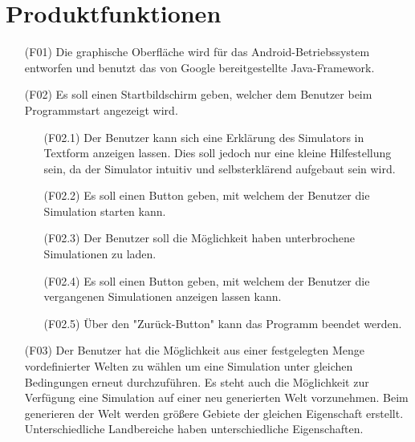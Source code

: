 \documentclass[a4paper, 10pt]{article}
\begin{document}
\section{Produktfunktionen}
\begin{enumerate}
\item[(F01)] Die graphische Oberfläche wird für das Android-Betriebssystem entworfen und benutzt das von Google bereitgestellte Java-Framework. 

\item[(F02)] Es soll einen Startbildschirm geben, welcher dem Benutzer beim Programmstart angezeigt wird.
\begin{enumerate}
\item[(F02.1)]
Der Benutzer kann sich eine Erklärung des Simulators in Textform anzeigen lassen. Dies soll jedoch nur eine kleine Hilfestellung sein, da der Simulator intuitiv und selbsterklärend aufgebaut sein wird.
\item[(F02.2)]
Es soll einen Button geben, mit welchem der Benutzer die Simulation starten kann.
\item[(F02.3)]
Der Benutzer soll die Möglichkeit haben unterbrochene Simulationen zu laden.
\item[(F02.4)]
Es soll einen Button geben, mit welchem der Benutzer die vergangenen Simulationen anzeigen lassen kann.
\item[(F02.5)]
Über den "Zurück-Button" kann das Programm beendet werden.
\end{enumerate}


\item[(F03)]
Der Benutzer hat die Möglichkeit aus einer festgelegten Menge vordefinierter Welten zu wählen um eine Simulation unter gleichen Bedingungen erneut durchzuführen.
Es steht auch die Möglichkeit zur Verfügung eine Simulation auf einer neu generierten Welt vorzunehmen.
Beim generieren der Welt werden größere Gebiete der gleichen Eigenschaft erstellt. Unterschiedliche Landbereiche haben unterschiedliche Eigenschaften.


\end{enumerate}
\end{document}
